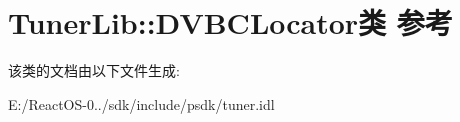 \hypertarget{class_tuner_lib_1_1_d_v_b_c_locator}{}\section{Tuner\+Lib\+:\+:D\+V\+B\+C\+Locator类 参考}
\label{class_tuner_lib_1_1_d_v_b_c_locator}


该类的文档由以下文件生成\+:\begin{DoxyCompactItemize}
\item 
E\+:/\+React\+O\+S-\/0../sdk/include/psdk/tuner.\+idl\end{DoxyCompactItemize}
